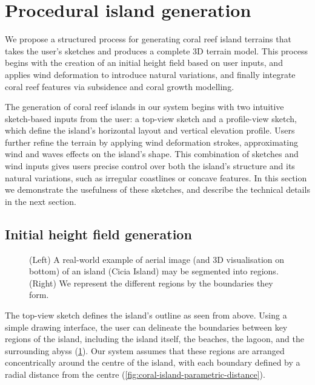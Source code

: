 \section{Procedural island generation}
\label{sec:coral-island-example-generation}

We propose a structured process for generating coral reef island terrains that takes the user's sketches and produces a complete 3D terrain model. This process begins with the creation of an initial height field based on user inputs, and applies wind deformation to introduce natural variations, and finally integrate coral reef features via subsidence and coral growth modelling.

The generation of coral reef islands in our system begins with two intuitive sketch-based inputs from the user: a top-view sketch and a profile-view sketch, which define the island's horizontal layout and vertical elevation profile. Users further refine the terrain by applying wind deformation strokes, approximating wind and waves effects on the island's shape. This combination of sketches and wind inputs gives users precise control over both the island's structure and its natural variations, such as irregular coastlines or concave features. In this section we demonstrate the usefulness of these sketches, and describe the technical details in the next section.

\subsection{Initial height field generation}
\label{sec:coral-island-generation-initial}

\begin{figure}[H]
    \caption{(Left) A real-world example of aerial image (and 3D visualisation on bottom) of an island (Cicia Island) may be segmented into regions. (Right) We represent the different regions by the boundaries they form.}
    \label{fig:coral-island-top-view-sketch}
\end{figure}

The top-view sketch defines the island's outline as seen from above. Using a simple drawing interface, the user can delineate the boundaries between key regions of the island, including the island itself, the beaches, the lagoon, and the surrounding abyss (\cref{fig:coral-island-top-view-sketch}). Our system assumes that these regions are arranged concentrically around the centre of the island, with each boundary defined by a radial distance from the centre (\cref{fig:coral-island-parametric-distance}).

